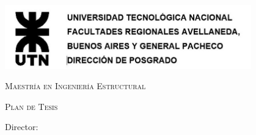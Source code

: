 % 
%
%

\thispagestyle{empty}
\begin{center}
\begin{minipage}{0.75\linewidth}
    \centering
    \includegraphics[width=0.8\textwidth]{imagenes/logo.jpg}\par

    \vspace{2cm}
	{\scshape\Large Maestría en Ingeniería Estructural \par}
	\vspace{2cm}
	{\scshape\Large Plan de Tesis \par}
    \vspace{0.5cm}
     

{\huge\bfseries \TituloTesis\par}

    \vspace{3cm}

    {\LARGE\bfseries \Tesista\par}
    \vspace{2cm}
    {\large Director: \Director \par}
    \vspace{1cm}
    

{\normalsize \Dia \, \Mes \, \Anio}

\end{minipage}
\end{center}
\clearpage